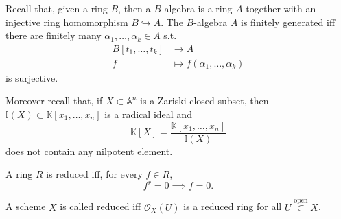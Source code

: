 \begin{rem}[]
	Recall that, given a ring $B$, then a $B$-algebra is a ring $A$ together with
	an injective ring homomorphism $B \hookrightarrow  A$.
	The $B$-algebra $A$ is finitely generated iff there are finitely many
	$\alpha_1, \ldots, \alpha_k \in A$ s.t.
	\begin{align}
		B [t_1, \ldots, t_k] &\to A \\
		f &\mapsto f(\alpha_1, \ldots, \alpha_k)
	\end{align} 
	is surjective.

	Moreover recall that, if $X \subset \mathbb{A}^{n}$ is a Zariski closed subset,
	then $\mathbb{I}\left( X \right) \subset \mathbb{K}\left[x_1, \ldots, x_n \right]$
	is a radical ideal
	and
	\begin{equation}
	\mathbb{K}[X] = \frac{\mathbb{K}\left[x_1, \ldots, x_n \right]}{\mathbb{I}\left( X \right)}
	\end{equation} 
	does not contain any nilpotent element.
\end{rem}

\begin{defn}
	A ring $R$ is reduced iff, for every $f \in R$,
	\begin{equation}
	f^r = 0 \implies f = 0
	.\end{equation} 
\end{defn}

\begin{defn}
	A scheme $X$ is called reduced iff $\mathcal{O}_{X} \left( U \right)$ is
	a reduced ring for all $U \stackrel{\text{open}}{\subset} X$.
\end{defn}

